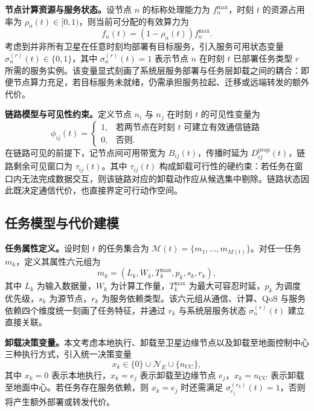 \textbf{节点计算资源与服务状态。}设节点 $n$ 的标称处理能力为 $f_n^{\max}$，时刻 $t$ 的资源占用率为 $\rho_n(t)\in[0,1)$，则当前可分配的有效算力为
\begin{equation}
  f_n(t)=\left(1-\rho_n(t)\right)f_n^{\max}.
\end{equation}
考虑到并非所有卫星在任意时刻均部署有目标服务，引入服务可用状态变量 $\sigma_n^{(r)}(t)\in\{0,1\}$，其中 $\sigma_n^{(r)}(t)=1$ 表示节点 $n$ 在时刻 $t$ 已部署任务类型 $r$ 所需的服务实例。该变量显式刻画了系统层服务部署与任务层卸载之间的耦合：即便节点算力充足，若目标服务未就绪，仍需承担服务拉起、迁移或远端转发的额外代价\cite{Tang2024TwoTimescaleJSAC,Feng2026LatencyAware}。

\textbf{链路模型与可见性约束。}定义节点 $n_i$ 与 $n_j$ 在时刻 $t$ 的可见性变量为
\begin{equation}
  \phi_{ij}(t)=
  \begin{cases}
    1, & \text{若两节点在时刻 } t \text{ 可建立有效通信链路} \\
    0, & \text{否则.}
  \end{cases}
\end{equation}
在链路可见的前提下，记节点间可用带宽为 $B_{ij}(t)$，传播时延为 $D_{ij}^{\mathrm{prop}}(t)$，链路剩余可见窗口为 $\tau_{ij}(t)$。其中 $\tau_{ij}(t)$ 构成卸载可行性的硬约束：若任务在窗口内无法完成数据交互，则该链路对应的卸载动作应从候选集中剔除。链路状态因此既决定通信代价，也直接界定可行动作空间。

\subsection{任务模型与代价建模}

\textbf{任务属性定义。}设时刻 $t$ 的任务集合为 $\mathcal{M}(t)=\{m_1,\ldots,m_{M(t)}\}$。对任一任务 $m_k$，定义其属性六元组为
\begin{equation}
  m_k=\left(L_k,W_k,T_k^{\max},p_k,s_k,r_k\right),
\end{equation}
其中 $L_k$ 为输入数据量，$W_k$ 为计算工作量，$T_k^{\max}$ 为最大可容忍时延，$p_k$ 为调度优先级，$s_k$ 为源节点，$r_k$ 为服务依赖类型。该六元组从通信、计算、QoS 与服务依赖四个维度统一刻画了任务特征，并通过 $r_k$ 与系统层服务状态 $\sigma_n^{(r)}(t)$ 建立直接关联。

\textbf{卸载决策变量。}本文考虑本地执行、卸载至卫星边缘节点以及卸载至地面控制中心三种执行方式，引入统一决策变量
\begin{equation}
  x_k \in \{0\}\cup \mathcal{N}_E \cup \{n_{\mathrm{CC}}\},
\end{equation}
其中 $x_k=0$ 表示本地执行，$x_k=e_j$ 表示卸载至边缘节点 $e_j$，$x_k=n_{\mathrm{CC}}$ 表示卸载至地面中心。若任务存在服务依赖，则 $x_k=e_j$ 时还需满足 $\sigma_{e_j}^{(r_k)}(t)=1$，否则将产生额外部署或转发代价。

